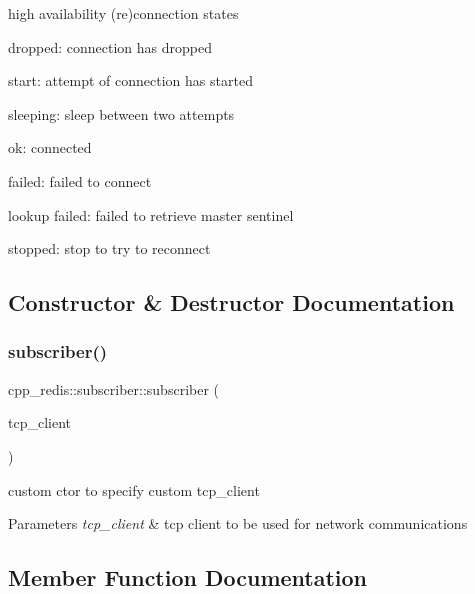 high availability (re)connection states
\begin{DoxyItemize}
\item dropped\+: connection has dropped
\item start\+: attempt of connection has started
\item sleeping\+: sleep between two attempts
\item ok\+: connected
\item failed\+: failed to connect
\item lookup failed\+: failed to retrieve master sentinel
\item stopped\+: stop to try to reconnect 
\end{DoxyItemize}

\subsection{Constructor \& Destructor Documentation}
\mbox{\label{classcpp__redis_1_1subscriber_a66136601f44564842e2c67de2da199af}} 
\subsubsection{\texorpdfstring{subscriber()}{subscriber()}}
{\footnotesize\ttfamily cpp\+\_\+redis\+::subscriber\+::subscriber (\begin{DoxyParamCaption}\item[{const std\+::shared\+\_\+ptr$<$ \mbox{\hyperlink{classcpp__redis_1_1network_1_1tcp__client__iface}{network\+::tcp\+\_\+client\+\_\+iface}} $>$ \&}]{tcp\+\_\+client }\end{DoxyParamCaption})\hspace{0.3cm}{\ttfamily [explicit]}}

custom ctor to specify custom tcp\+\_\+client


\begin{DoxyParams}{Parameters}
{\em tcp\+\_\+client} & tcp client to be used for network communications \\
\hline
\end{DoxyParams}


\subsection{Member Function Documentation}
\mbox{\label{classcpp__redis_1_1subscriber_a2faf9e9cc9c95e3c0fed148355af84f1}} 

